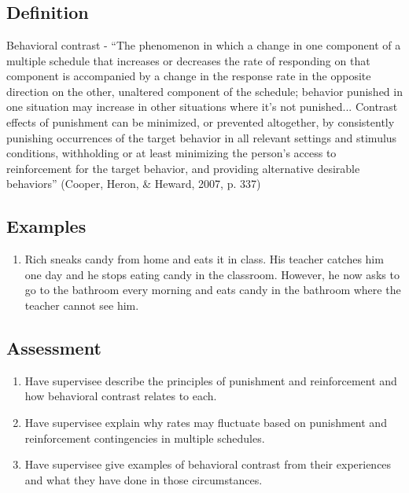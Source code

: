 \section{\fourFKThirtyEight{}}
\subsection{Definition} 
Behavioral contrast - ``The  phenomenon in which a change in one component of a multiple schedule that increases or decreases the rate of responding on that component is accompanied by a change in the response rate in the opposite direction on the other, unaltered component of the schedule; behavior punished in one situation may increase in other situations where it's not punished... Contrast effects of punishment can be minimized, or prevented altogether, by consistently punishing occurrences of the target behavior in all relevant settings and stimulus conditions, withholding or at least minimizing the person's access to reinforcement for the target behavior, and providing alternative desirable behaviors'' (Cooper, Heron, \& Heward, 2007, p. 337)
%
\subsection{Examples}
\begin{enumerate}
\item Rich sneaks candy from home and eats it in class. His teacher catches him one day and he stops eating candy in the classroom. However, he now asks to go to the bathroom every morning and eats candy in the bathroom where the teacher cannot see him. 
%
\end{enumerate}
%
\subsection{Assessment}
\begin{enumerate}
\item Have supervisee describe the principles of punishment and reinforcement and how behavioral contrast relates to each.
\item Have supervisee explain why rates may fluctuate based on punishment and reinforcement contingencies in multiple schedules.
\item Have supervisee give examples of behavioral contrast from their experiences and what they have done in those circumstances.
%
\end{enumerate}
%
